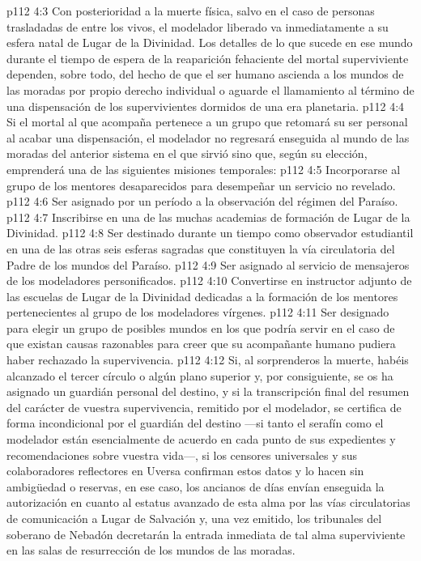 \vs p112 4:3 Con posterioridad a la muerte física, salvo en el caso de personas trasladadas de entre los vivos, el modelador liberado va inmediatamente a su esfera natal de Lugar de la Divinidad. Los detalles de lo que sucede en ese mundo durante el tiempo de espera de la reaparición fehaciente del mortal superviviente dependen, sobre todo, del hecho de que el ser humano ascienda a los mundos de las moradas por propio derecho individual o aguarde el llamamiento al término de una dispensación de los supervivientes dormidos de una era planetaria.
\vs p112 4:4 Si el mortal al que acompaña pertenece a un grupo que retomará su ser personal al acabar una dispensación, el modelador no regresará enseguida al mundo de las moradas del anterior sistema en el que sirvió sino que, según su elección, emprenderá una de las siguientes misiones temporales:
\vs p112 4:5 Incorporarse al grupo de los mentores desaparecidos para desempeñar un servicio no revelado.
\vs p112 4:6 Ser asignado por un período a la observación del régimen del Paraíso.
\vs p112 4:7 Inscribirse en una de las muchas academias de formación de Lugar de la Divinidad.
\vs p112 4:8 Ser destinado durante un tiempo como observador estudiantil en una de las otras seis esferas sagradas que constituyen la vía circulatoria del Padre de los mundos del Paraíso.
\vs p112 4:9 Ser asignado al servicio de mensajeros de los modeladores personificados.
\vs p112 4:10 Convertirse en instructor adjunto de las escuelas de Lugar de la Divinidad dedicadas a la formación de los mentores pertenecientes al grupo de los modeladores vírgenes.
\vs p112 4:11 Ser designado para elegir un grupo de posibles mundos en los que podría servir en el caso de que existan causas razonables para creer que su acompañante humano pudiera haber rechazado la supervivencia.
\vs p112 4:12 \pc Si, al sorprenderos la muerte, habéis alcanzado el tercer círculo o algún plano superior y, por consiguiente, se os ha asignado un guardián personal del destino, y si la transcripción final del resumen del carácter de vuestra supervivencia, remitido por el modelador, se certifica de forma incondicional por el guardián del destino ---si tanto el serafín como el modelador están esencialmente de acuerdo en cada punto de sus expedientes y recomendaciones sobre vuestra vida---, si los censores universales y sus colaboradores reflectores en Uversa confirman estos datos y lo hacen sin ambigüedad o reservas, en ese caso, los ancianos de días envían enseguida la autorización en cuanto al estatus avanzado de esta alma por las vías circulatorias de comunicación a Lugar de Salvación y, una vez emitido, los tribunales del soberano de Nebadón decretarán la entrada inmediata de tal alma superviviente en las salas de resurrección de los mundos de las moradas.
